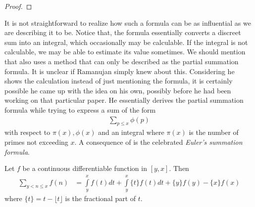 \documentclass[elemannt.tex]{subfile}
\begin{document}
		\begin{proof}

		\end{proof}
	It is not straightforward to realize how such a formula can be as influential as we are describing it to be. Notice that, the formula essentially converts a discreet sum into an integral, which occasionally may be calculable. If the integral is not calculable, we may be able to estimate its value sometimes. We should mention that \textcite[Page $83$, $\S4$]{aiyangar_hardy_vennkatesvara_seshu_aiyar_p_wilson_1927} also uses a method that can only be described as the partial summation formula. It is unclear if Ramanujan simply knew about this. Considering he shows the calculation instead of just mentioning the formula, it is certainly possible he came up with the idea on his own, possibly before he had been working on that particular paper. He essentially derives the partial summation formula while trying to express a sum of the form
		\begin{align*}
			\sum_{p\leq x}\phi(p)
		\end{align*}
	with respect to $\pi(x),\phi(x)$ and an integral where $\pi(x)$ is the number of primes not exceeding $x$. A consequence of  is the celebrated \textit{Euler's summation formula}.
		\begin{theorem}\label{thm:eulersum}
			Let $f$ be a continuous differentiable function in $[y,x]$. Then
				\begin{align*}
					\sum_{y<n\leq x}f(n)
						& = \int\limits_{y}^{x}f(t)dt+\int\limits_{y}^{x}\{t\}f(t)dt+\{y\}f(y)-\{x\}f(x)
				\end{align*}
			where $\{t\}=t-\lfloor{t}\rfloor$ is the fractional part of $t$.
		\end{theorem}
\end{document}
